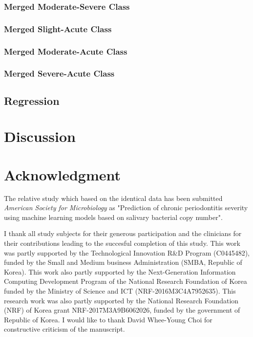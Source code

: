 \documentclass[aps, 11pt, a4paper]{article}
\begin{document}
    		\subsubsection{Merged Moderate-Severe Class}
    		
    		\subsubsection{Merged Slight-Acute Class}
    		
    		\subsubsection{Merged Moderate-Acute Class}
    		
    		\subsubsection{Merged Severe-Acute Class}
    	
    	\subsection{Regression}
    
    \section{Discussion}
    
    \section{Acknowledgment}
    	The relative study which based on the identical data has been submitted \textit{American Society for Microbiology} as "Prediction of chronic periodontitis severity using machine learning models based on salivary bacterial copy number". 
    	
    	I thank all study subjects for their generous participation and the clinicians for their contributions leading to the succesful completion of this study. This work was partly supported by the Technological Innovation R\&D Program (C0445482), funded by the Small and Medium business Administration (SMBA, Republic of Korea). This work also partly supported by the Next-Generation Information Computing Development Program of the National Research Foundation of Korea funded by the Ministry of Science and ICT (NRF-2016M3C4A7952635). This research work was also partly supported by the National Research Foundation (NRF) of Korea grant NRF-2017M3A9B6062026, funded by the government of Republic of Korea. I would like to thank David Whee-Young Choi for constructive criticism of the manuscript. 
    
    
    
\end{document}
